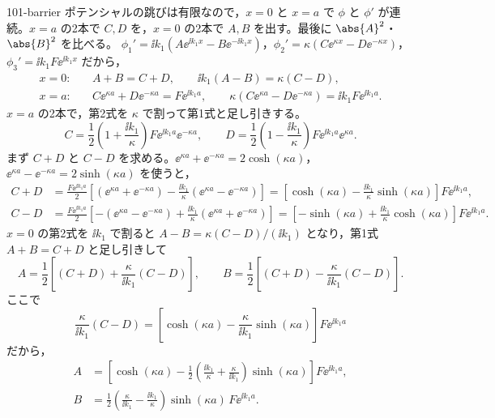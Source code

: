 \documentclass[uplatex,dvipdfmx,a4paper,11pt]{jsarticle}
\begin{document}
\begin{kaisetsu}{101-barrier}
\houshin ポテンシャルの跳びは有限なので，$x=0$ と $x=a$ で $\phi$ と $\phi'$ が連続。$x=a$ の2本で $C,D$ を，$x=0$ の2本で $A,B$ を出す。最後に $\abs{A}^{2}$・$\abs{B}^{2}$ を比べる。
\keisan {} $\phi_{1}'=\ii k_{1}(A\ee^{\ii k_{1}x}-B\ee^{-\ii k_{1}x})$，$\phi_{2}'=\kappa(C\ee^{\kappa x}-D\ee^{-\kappa x})$，$\phi_{3}'=\ii k_{1}F\ee^{\ii k_{1}x}$ だから，
\begin{align*}
  x=0:&\quad A+B=C+D, \qquad \ii k_{1}(A-B)=\kappa(C-D),\\
  x=a:&\quad C\ee^{\kappa a}+D\ee^{-\kappa a}=F\ee^{\ii k_{1}a}, \qquad \kappa(C\ee^{\kappa a}-D\ee^{-\kappa a})=\ii k_{1}F\ee^{\ii k_{1}a} .
\end{align*}
 $x=a$ の2本で，第2式を $\kappa$ で割って第1式と足し引きする。
\[ C=\frac{1}{2}\left(1+\frac{\ii k_{1}}{\kappa}\right)F\ee^{\ii k_{1}a}\ee^{-\kappa a},\qquad D=\frac{1}{2}\left(1-\frac{\ii k_{1}}{\kappa}\right)F\ee^{\ii k_{1}a}\ee^{\kappa a} . \]
 まず $C+D$ と $C-D$ を求める。$\ee^{\kappa a}+\ee^{-\kappa a}=2\cosh(\kappa a)$，$\ee^{\kappa a}-\ee^{-\kappa a}=2\sinh(\kappa a)$ を使うと，
\begin{align*}
  C+D&=\frac{F\ee^{\ii k_{1}a}}{2}\left[(\ee^{\kappa a}+\ee^{-\kappa a})-\frac{\ii k_{1}}{\kappa}(\ee^{\kappa a}-\ee^{-\kappa a})\right]
     =\left[\cosh(\kappa a)-\frac{\ii k_{1}}{\kappa}\sinh(\kappa a)\right]F\ee^{\ii k_{1}a},\\
  C-D&=\frac{F\ee^{\ii k_{1}a}}{2}\left[-(\ee^{\kappa a}-\ee^{-\kappa a})+\frac{\ii k_{1}}{\kappa}(\ee^{\kappa a}+\ee^{-\kappa a})\right]
     =\left[-\sinh(\kappa a)+\frac{\ii k_{1}}{\kappa}\cosh(\kappa a)\right]F\ee^{\ii k_{1}a} .
\end{align*}
$x=0$ の第2式を $\ii k_{1}$ で割ると $A-B=\kappa(C-D)/(\ii k_{1})$ となり，第1式 $A+B=C+D$ と足し引きして
\[ A=\frac{1}{2}\left[(C+D)+\frac{\kappa}{\ii k_{1}}(C-D)\right],\qquad B=\frac{1}{2}\left[(C+D)-\frac{\kappa}{\ii k_{1}}(C-D)\right] . \]
ここで
\[ \frac{\kappa}{\ii k_{1}}(C-D)=\left[\cosh(\kappa a)-\frac{\kappa}{\ii k_{1}}\sinh(\kappa a)\right]F\ee^{\ii k_{1}a} \]
だから，
\begin{align*}
  A&=\left[\cosh(\kappa a)-\frac{1}{2}\left(\frac{\ii k_{1}}{\kappa}+\frac{\kappa}{\ii k_{1}}\right)\sinh(\kappa a)\right]F\ee^{\ii k_{1}a},\\
  B&=\frac{1}{2}\left(\frac{\kappa}{\ii k_{1}}-\frac{\ii k_{1}}{\kappa}\right)\sinh(\kappa a)\,F\ee^{\ii k_{1}a} .
\end{align*}

\end{kaisetsu}
\end{document}
